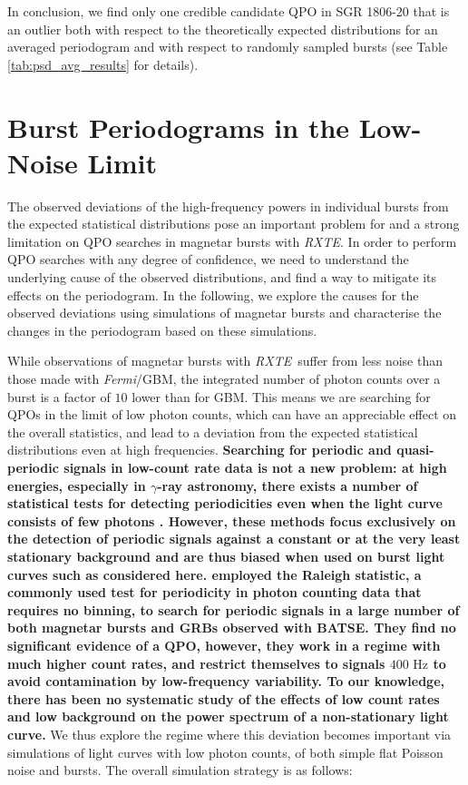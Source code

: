 \documentclass[numberedappendix]{emulateapj}
\newcommand{\hz}{\,\mathrm{Hz}}
\newcommand{\project}[1]{\textsl{#1}}
\newcommand{\fermi}{\project{Fermi}}
\newcommand{\rxte}{\project{RXTE}}
\begin{document}
In conclusion, we find only one credible candidate QPO in SGR 1806-20 that is an outlier both with respect to the theoretically expected distributions for an averaged periodogram and with respect to randomly sampled bursts (see Table \ref{tab:psd_avg_results} for details).


\section{Burst Periodograms in the Low-Noise Limit}
\label{sec:weakbursts}

The observed deviations of the high-frequency powers in individual bursts from the expected statistical distributions pose an important problem for and a strong limitation on QPO searches in magnetar bursts with \rxte. In order to perform QPO searches with any degree of confidence, we need to understand the underlying cause of the observed distributions, and find a way to mitigate its effects on the periodogram. In the following, we explore the causes for the observed deviations using simulations of magnetar bursts and characterise the changes in the periodogram based on these simulations. 

While observations of magnetar bursts with \rxte\ suffer from less noise than those made with \fermi/GBM, the integrated number of photon counts over a burst is a factor of $10$ lower than for GBM. This means we are searching for QPOs in the limit of low photon counts, which can have an appreciable effect on the overall statistics, and lead to a deviation from the expected statistical distributions even at high frequencies.  \textbf{Searching for periodic and quasi-periodic signals in low-count rate data is not a new problem: at high energies, especially in $\gamma$-ray astronomy, there exists a number of statistical tests for detecting periodicities even when the light curve consists of few photons \citep[e.g.][]{buccheri1983,dejager1988}. However, these methods focus exclusively on the detection of periodic signals against a constant or at the very least stationary background and are thus biased when used on burst light curves such as considered here. \citet{kruger2002} employed the Raleigh statistic, a commonly used test for periodicity in photon counting data that requires no binning, to search for periodic signals in a large number of both magnetar bursts and GRBs observed with BATSE. They find no significant evidence of a QPO, however, they work in a regime with much higher count rates, and restrict themselves to signals $400\,\hz$ to avoid contamination by low-frequency variability. To our knowledge, there has been no systematic study of the effects of low count rates and low background on the power spectrum of a non-stationary light curve.} We thus explore the regime where this deviation becomes important via simulations of light curves with low photon counts, of both simple flat Poisson noise and bursts.
The overall simulation strategy is as follows:
\end{document}
